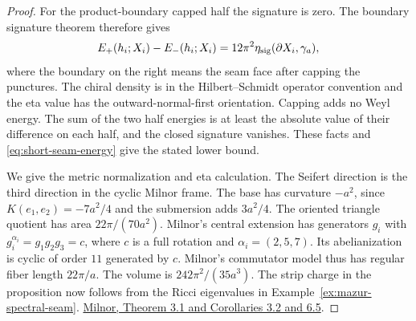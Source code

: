\begin{proof}
For the product-boundary capped half the signature is zero.
The boundary signature theorem therefore gives
\[
 E_+(h_i;X_i)-E_-(h_i;X_i)
  =12\pi^2\eta_{\rm sig}(\partial X_i,\gamma_a),
\]
where the boundary on the right means the seam face after
capping the punctures. The chiral density is in the
Hilbert--Schmidt operator convention and the eta value has
the outward-normal-first orientation. Capping adds no Weyl
energy. The sum of the two half energies is at least the
absolute value of their difference on each half, and the
closed signature vanishes. These facts and
\eqref{eq:short-seam-energy} give the stated lower bound.
\cite[Theorem (4.14)]{APS1975SpectralI}
\cite[\S2]{BiquardHerzlichRumin2007Diabatic}

We give the metric normalization and eta calculation. The
Seifert direction is the third direction in the cyclic
Milnor frame. The base has curvature \(-a^2\), since
\(K(e_1,e_2)=-7a^2/4\) and the submersion adds \(3a^2/4\).
The oriented triangle quotient has area \(22\pi/(70a^2)\).
Milnor's central extension has generators \(g_i\) with
\(g_i^{\alpha_i}=g_1g_2g_3=c\), where \(c\) is a full
rotation and \(\alpha_i=(2,5,7)\).
Its abelianization is cyclic of order \(11\) generated by \(c\).
Milnor's commutator model thus has regular fiber length
\(22\pi/a\). The volume is \(242\pi^2/(35a^3)\).
The strip charge in the proposition now follows from the
Ricci eigenvalues in Example~\ref{ex:mazur-spectral-seam}.
\href{https://webhomes.maths.ed.ac.uk/~v1ranick/papers/neuwir3.pdf}{Milnor, Theorem 3.1 and Corollaries 3.2 and 6.5}.


\end{proof}
